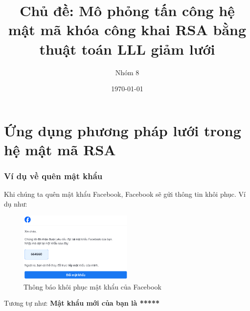 \documentclass{beamer}
\title[{\makebox[.15\paperwidth]{MI4100 - Mật mã và độ phức tạp thuật toán}}]{Chủ đề: Mô phỏng tấn công hệ mật mã khóa công khai RSA bằng thuật toán LLL giảm lưới}
\author[Nhóm 8]{Nhóm 8}
\date[\today]{\today}
\numberwithin{equation}{section}
\begin{document}
\begin{frame}
\titlepage
\end{frame}

\section{Ứng dụng phương pháp lưới trong hệ mật mã RSA}
\begin{frame}
\frametitle{Ví dụ về quên mật khẩu}
Khi chúng ta quên mật khẩu Facebook, Facebook sẽ gửi thông tin khôi phục. Ví dụ như:

\begin{figure}
\includegraphics[width=0.5\textwidth]{pictures/facebook.png}
\caption{Thông báo khôi phục mật khẩu của Facebook}
\end{figure}

Tương tự như:
\textbf{Mật khẩu mới của bạn là *****}
\end{frame}
\end{document}
